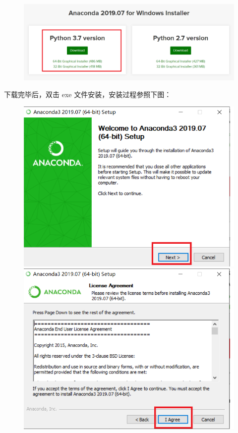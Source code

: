\begin{figure}[!ht]
  \centering
  \includegraphics[scale=0.5]{figure/chapter1/anaconda2.png}
\end{figure}

下载完毕后，双击 exe 文件安装，安装过程参照下图：


\begin{figure}[!ht]
  \centering
  \includegraphics[scale=0.5]{figure/chapter1/anaconda7.png}\quad
  \includegraphics[scale=0.5]{figure/chapter1/anaconda8.png}
\end{figure}

